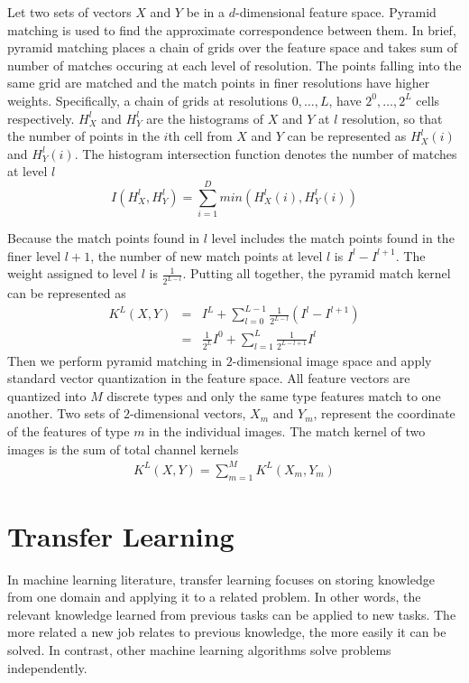 Let two sets of vectors $X$ and $Y$ be in a $d$-dimensional feature space. Pyramid matching is used to find the approximate correspondence between them. In brief, pyramid matching places a chain of grids over the feature space and takes sum of number of matches occuring at each level of resolution. The points falling into the same grid are matched and the match points in finer resolutions have higher weights. Specifically, a chain of grids at resolutions $0,\dotso,L$, have $2^0,\dotso,2^L$ cells respectively. $H_{X}^l$ and $H_{Y}^l$ are the histograms of $X$ and $Y$ at $l$ resolution, so that the number of points in the $i$th cell from $X$ and $Y$ can be represented as $H_{X}^l(i)$ and $H_{Y}^l(i)$. The histogram intersection function denotes the number of matches at level $l$
\begin{equation}\label{eq:HistInterFunc}
I(H_{X}^l, H_{Y}^l) = \sum_{i=1}^D min(H_{X}^l(i), H_{Y}^l(i))
\end{equation}

Because the match points found in $l$ level includes the match points found in the finer level $l+1$, the number of new match points at level $l$ is $I^l - I^{l+1}$. The weight assigned to level $l$ is $\frac{1}{2^{L-l}}$. Putting all together, the pyramid match kernel can be represented as
\begin{eqnarray}\label{eq:PyramidChanMatchKernel}
  K^L(X,Y) & = & I^L + \sum_{l=0}^{L-1} \frac{1}{2^{L-l}}(I^l-I^{l+1})\\
 & = & \frac{1}{2^L}I^0 + \sum_{l=1}^{L}\frac{1}{2^{L-l+1}}I^l
\end{eqnarray}
Then we perform pyramid matching in $2$-dimensional image space and apply standard vector quantization in the feature space. All feature vectors are quantized into $M$ discrete types and only the same type features match to one another. Two sets of $2$-dimensional vectors, $X_m$ and $Y_m$, represent the coordinate of the features of type $m$ in the individual images. The match kernel of two images is the sum of total channel kernels
\begin{eqnarray}\label{eq:PyramidMatchKernel}
  K^L(X,Y) = \sum_{m=1}^{M} K^L(X_m, Y_m)
\end{eqnarray}

\section{Transfer Learning}

In machine learning literature, transfer learning\citep{pan2010survey} focuses on storing knowledge from one domain and applying it to a related problem. In other words, the relevant knowledge learned from previous tasks can be applied to new tasks. The more related a new job relates to previous knowledge, the more easily it can be solved. In contrast, other machine learning algorithms solve problems independently. 

